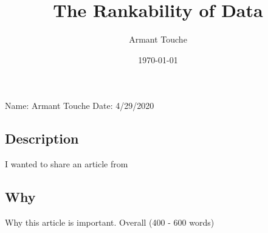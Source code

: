 \documentclass[a4paper,man,biblatex]{apa6}
\title{The Rankability of Data}
\author{Armant Touche}
\affiliation{Portland State University}
\date{\today}
\begin{document}
\thispagestyle{otherpage}
\setcounter{biburllcpenalty}{7000}
\setcounter{biburlucpenalty}{8000}


\noindent Name: Armant Touche\newline
\noindent Date: 4/29/2020

\subsection{Description} I wanted to share an article from

\subsection{Why} Why this article is important. Overall (400 - 600 words)

\printbibliography
\end{document}
